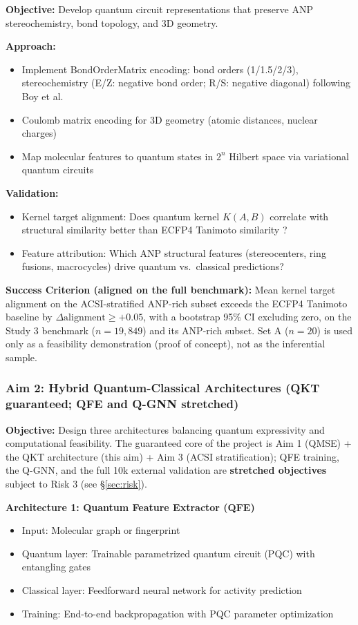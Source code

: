 \documentclass[11pt,a4paper]{article}
\begin{document}
\textbf{Objective:} Develop quantum circuit representations that preserve ANP stereochemistry, bond topology, and 3D geometry.

\textbf{Approach:}
\begin{itemize}
    \item Implement BondOrderMatrix encoding: bond orders (1/1.5/2/3), stereochemistry (E/Z: negative bond order; R/S: negative diagonal) following Boy et al.\ \cite{boy2025}
    \item Coulomb matrix encoding for 3D geometry (atomic distances, nuclear charges) \cite{rupp2012}
    \item Map molecular features to quantum states in $2^n$ Hilbert space via variational quantum circuits
\end{itemize}

\textbf{Validation:}
\begin{itemize}
    \item Kernel target alignment: Does quantum kernel $K(A,B)$ correlate with structural similarity better than ECFP4 Tanimoto similarity \cite{rogers2010}?
    \item Feature attribution: Which ANP structural features (stereocenters, ring fusions, macrocycles) drive quantum vs.\ classical predictions?
\end{itemize}

\textbf{Success Criterion (aligned on the full benchmark):} Mean kernel target alignment on the ACSI-stratified ANP-rich subset exceeds the ECFP4 Tanimoto baseline by $\Delta\text{alignment} \geq +0.05$, with a bootstrap 95\% CI excluding zero, on the Study 3 benchmark ($n = 19{,}849$) and its ANP-rich subset. Set A ($n = 20$) is used only as a feasibility demonstration (proof of concept), not as the inferential sample.

\subsubsection{Aim 2: Hybrid Quantum-Classical Architectures (QKT guaranteed; QFE and Q-GNN stretched)}

\textbf{Objective:} Design three architectures balancing quantum expressivity and computational feasibility. The guaranteed core of the project is Aim 1 (QMSE) + the QKT architecture (this aim) + Aim 3 (ACSI stratification); QFE training, the Q-GNN, and the full 10k external validation are \textbf{stretched objectives} subject to Risk 3 (see \S\ref{sec:risk}).

\textbf{Architecture 1: Quantum Feature Extractor (QFE)}
\begin{itemize}
    \item Input: Molecular graph or fingerprint
    \item Quantum layer: Trainable parametrized quantum circuit (PQC) with entangling gates
    \item Classical layer: Feedforward neural network for activity prediction
    \item Training: End-to-end backpropagation with PQC parameter optimization
\end{itemize}
\end{document}
